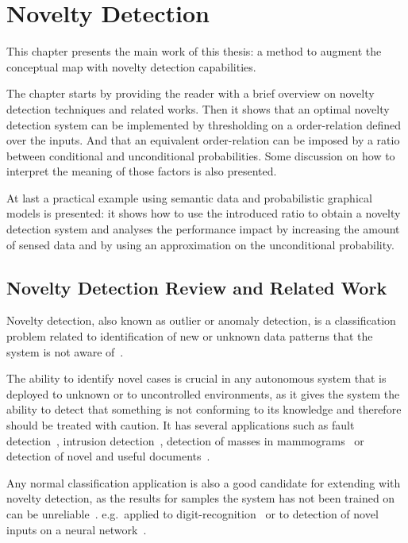 \chapter{Novelty Detection}\label{chap:novelty-intro}

This chapter presents the main work of this thesis: a method to augment the conceptual
map with novelty detection capabilities.

The chapter starts by providing the reader with a brief overview on novelty detection
techniques and related works. Then it shows that an optimal novelty detection system
can be implemented by thresholding on a order-relation defined over the inputs.
And that an equivalent order-relation can be imposed by a ratio between
conditional and unconditional probabilities.
Some discussion on how to interpret the meaning of those factors is also
presented.

At last a practical example using semantic data and probabilistic graphical
models is presented: it shows how to use the introduced ratio to obtain a
novelty detection system and analyses the performance impact by increasing
the amount of sensed data and by using an approximation on the unconditional
probability.


\section{Novelty Detection Review and Related Work}
Novelty detection, also known as outlier or anomaly detection, is a
classification problem related to identification of new or unknown data
patterns that the system is not aware of~\cite{markou2003novelty}.

The ability to identify novel cases is crucial in any autonomous system
that is deployed to unknown or to uncontrolled environments, as it gives the
system the ability to detect that something is not conforming to its knowledge and
therefore should be treated with caution.
It has several applications such as fault detection~\cite{tarassenko1999novelty},
intrusion detection~\cite{fan2001using},
detection of masses in mammograms~\cite{tarassenko1995novelty} or detection of
novel and useful documents~\cite{zhang2002novelty}.

Any normal classification application is also a good candidate for extending
with novelty detection, as the results for samples the system has not been
trained on can be unreliable~\cite{devarakota2008reliability}.
e.g.\ applied to digit-recognition~\cite{tax1998outlier}
or to detection of novel inputs on a neural network~\cite{bishop1994novelty}.

